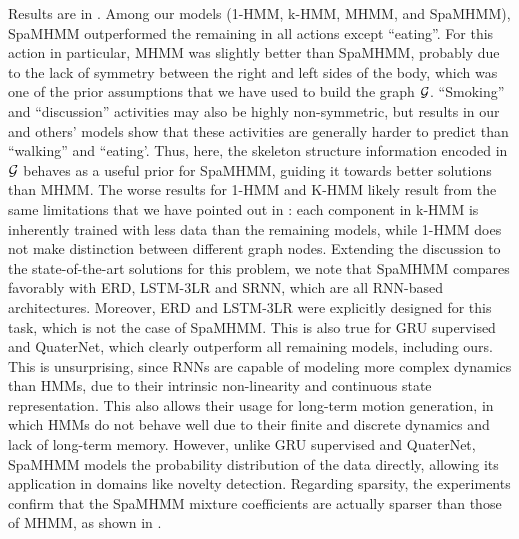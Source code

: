 Results are in . Among our models (1-HMM, k-HMM, MHMM, and Spa\allowbreak MHMM), SpaMHMM outperformed the remaining in all actions except ``eating''. For this action in particular, MHMM was slightly better than SpaMHMM, probably due to the lack of symmetry between the right and left sides of the body, which was one of the prior assumptions that we have used to build the graph ${\mathcal{G}}$. ``Smoking'' and ``discussion'' activities may also be highly non-symmetric, but results in our and others' models show that these activities are generally harder to predict than ``walking'' and ``eating'. Thus, here, the skeleton structure information encoded in ${\mathcal{G}}$ behaves as a useful prior for SpaMHMM, guiding it towards better solutions than MHMM. The worse results for 1-HMM and K-HMM likely result from the same limitations that we have pointed out in : each component in k-HMM is inherently trained with less data than the remaining models, while 1-HMM does not make distinction between different graph nodes. Extending the discussion to the state-of-the-art solutions for this problem, we note that SpaMHMM compares favorably with ERD, LSTM-3LR and SRNN, which are all RNN-based architectures. Moreover, ERD and LSTM-3LR were explicitly designed for this task, which is not the case of SpaMHMM. This is also true for GRU supervised and QuaterNet, which clearly outperform all remaining models, including ours. This is unsurprising, since RNNs are capable of modeling more complex dynamics than HMMs, due to their intrinsic non-linearity and continuous state representation. This also allows their usage for long-term motion generation, in which HMMs do not behave well due to their finite and discrete dynamics and lack of long-term memory. However, unlike GRU supervised and QuaterNet, SpaMHMM  models the probability distribution of the data directly, allowing its application in domains like novelty detection. Regarding sparsity, the experiments confirm that the SpaMHMM mixture coefficients are actually sparser than those of MHMM, as shown in .

